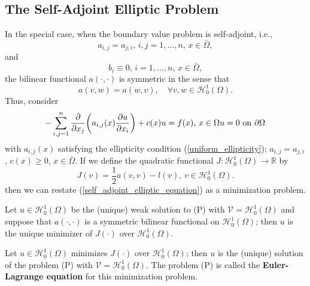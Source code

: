 \subsection{The Self-Adjoint Elliptic Problem}
In the special case, when the boundary value problem is self-adjoint, i.e.,
\begin{equation*}
a_{i, j} = a_{j, i} \text{,     }i,j=1,\dots,n\text{,    }x\in\bar{\Omega},
\end{equation*}
and
\begin{equation*}
b_i \equiv 0 \text{,     }i=1,\dots,n \text{,  }x\in\bar\Omega,
\end{equation*}
the bilinear functional $a(\cdot, \cdot)$ is symmetric in the sense that
\begin{equation*}
	a(v,w) = a(w,v), \quad \forall v,w \in\mathscr{H}_{0}^{1}(\Omega).
\end{equation*}
Thus, consider
\begin{equation}
\label{self_adjoint_elliptic_equation}
-\sum_{i,j=1}^{n} \frac{\partial}{\partial x_j} \bigg(a_{i,j}(x)\frac{\partial u}{\partial x_i}\bigg) + c(x)u = f(x) \text{,     } x \in \Omega \\
u = 0 \text{ on } \partial\Omega
\end{equation}
with $a_{i,j}(x)$ satisfying the ellipticity condition (\ref{uniform_ellipticity}); $a_{i,j}=a_{j,i}$, $c(x)\geq0$, $x\in\bar{\Omega}$. 
If we define the quadratic functional $J:\mathscr{H}_{0}^{1}(\Omega) \to \mathbb{R}$ by
\begin{equation*}
	J(v) = \frac{1}{2} a(v, v) - l(v) \text{,     }v\in\mathscr{H}_{0}^{1}(\Omega).
\end{equation*}
then we can restate (\ref{self_adjoint_elliptic_equation}) as a minimization problem. 
\begin{lemma}
	Let $u\in \mathscr{H}_{0}^{1}(\Omega)$ be the (unique) weak solution to (P) with $\mathscr{V} = \mathscr{H}_{0}^{1}(\Omega)$ and suppose that $a(\cdot, \cdot)$ is a symmetric bilinear functional on $\mathscr{H}_{0}^{1}(\Omega)$; then $u$ is the unique minimizer of $J(\cdot)$ over $\mathscr{H}_{0}^{1}(\Omega)$.
\end{lemma}
\begin{lemma}
	Let $u\in \mathscr{H}_{0}^{1}(\Omega)$ minimizes $J(\cdot)$ over $\mathscr{H}_{0}^{1}(\Omega)$; then $u$ is the (unique) solution of the problem (P) with $\mathscr{V} = \mathscr{H}_{0}^{1}(\Omega)$. The problem (P) is called the \textbf{Euler-Lagrange equation} for this minimization problem.
\end{lemma}
